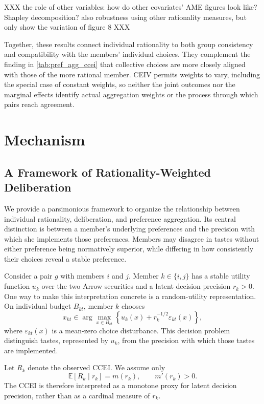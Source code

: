 \documentclass[11 pt]{article}
\begin{document}
XXX the role of other variables: how do other covariates' AME figures look like? Shapley decomposition? also robustness using other rationality measures, but only show the variation of figure 8 XXX


Together, these results connect individual rationality to both group consistency and compatibility with the members' individual choices. They complement the finding in \autoref{tab:pref_agg_ccei} that collective choices are more closely aligned with those of the more rational member. CEIV permits weights to vary, including the special case of constant weights, so neither the joint outcomes nor the marginal effects identify actual aggregation weights or the process through which pairs reach agreement.

\section{Mechanism}

\subsection{A Framework of Rationality-Weighted Deliberation}
\label{sec:framework}

We provide a parsimonious framework to organize the relationship between individual rationality, deliberation, and preference aggregation. Its central distinction is between a member's underlying preferences and the precision with which she implements those preferences. Members may disagree in tastes without either preference being normatively superior, while differing in how consistently their choices reveal a stable preference.

Consider a pair $g$ with members $i$ and $j$. Member $k\in\{i,j\}$ has a stable utility function $u_k$ over the two Arrow securities and a latent decision precision $r_k>0$. One way to make this interpretation concrete is a random-utility representation. On individual budget $B_{kt}$, member $k$ chooses
\begin{equation}
    x_{kt}\in\arg\max_{x\in B_{kt}}
    \left\{u_k(x)+r_k^{-1/2}\varepsilon_{kt}(x)\right\},
    \label{eq:random_utility_appendix}
\end{equation}
where $\varepsilon_{kt}(x)$ is a mean-zero choice disturbance. This decision problem distinguish tastes, represented by $u_k$, from the precision with which those tastes are implemented.

Let $R_k$ denote the observed CCEI. We assume only
\begin{equation}
    \mathbb{E}[R_k\mid r_k]=m(r_k),
    \qquad m'(r_k)>0.
    \label{eq:ccei_precision_appendix}
\end{equation}
The CCEI is therefore interpreted as a monotone proxy for latent decision precision, rather than as a cardinal measure of $r_k$. 
\end{document}
